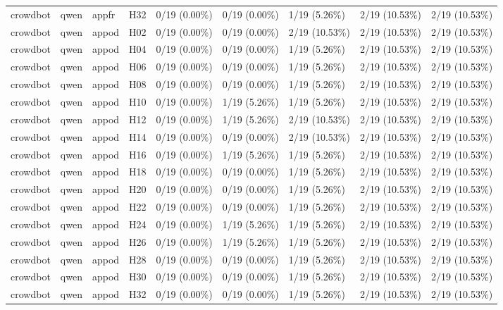 \begin{longtable}{lllllllll}
crowdbot & qwen & appfr & H32 & 0/19 (0.00\%) & 0/19 (0.00\%) & 1/19 (5.26\%) & 2/19 (10.53\%) & 2/19 (10.53\%) \\
crowdbot & qwen & appod & H02 & 0/19 (0.00\%) & 0/19 (0.00\%) & 2/19 (10.53\%) & 2/19 (10.53\%) & 2/19 (10.53\%) \\
crowdbot & qwen & appod & H04 & 0/19 (0.00\%) & 0/19 (0.00\%) & 1/19 (5.26\%) & 2/19 (10.53\%) & 2/19 (10.53\%) \\
crowdbot & qwen & appod & H06 & 0/19 (0.00\%) & 0/19 (0.00\%) & 1/19 (5.26\%) & 2/19 (10.53\%) & 2/19 (10.53\%) \\
crowdbot & qwen & appod & H08 & 0/19 (0.00\%) & 0/19 (0.00\%) & 1/19 (5.26\%) & 2/19 (10.53\%) & 2/19 (10.53\%) \\
crowdbot & qwen & appod & H10 & 0/19 (0.00\%) & 1/19 (5.26\%) & 1/19 (5.26\%) & 2/19 (10.53\%) & 2/19 (10.53\%) \\
crowdbot & qwen & appod & H12 & 0/19 (0.00\%) & 1/19 (5.26\%) & 2/19 (10.53\%) & 2/19 (10.53\%) & 2/19 (10.53\%) \\
crowdbot & qwen & appod & H14 & 0/19 (0.00\%) & 0/19 (0.00\%) & 2/19 (10.53\%) & 2/19 (10.53\%) & 2/19 (10.53\%) \\
crowdbot & qwen & appod & H16 & 0/19 (0.00\%) & 1/19 (5.26\%) & 1/19 (5.26\%) & 2/19 (10.53\%) & 2/19 (10.53\%) \\
crowdbot & qwen & appod & H18 & 0/19 (0.00\%) & 0/19 (0.00\%) & 1/19 (5.26\%) & 2/19 (10.53\%) & 2/19 (10.53\%) \\
crowdbot & qwen & appod & H20 & 0/19 (0.00\%) & 0/19 (0.00\%) & 1/19 (5.26\%) & 2/19 (10.53\%) & 2/19 (10.53\%) \\
crowdbot & qwen & appod & H22 & 0/19 (0.00\%) & 0/19 (0.00\%) & 1/19 (5.26\%) & 2/19 (10.53\%) & 2/19 (10.53\%) \\
crowdbot & qwen & appod & H24 & 0/19 (0.00\%) & 1/19 (5.26\%) & 1/19 (5.26\%) & 2/19 (10.53\%) & 2/19 (10.53\%) \\
crowdbot & qwen & appod & H26 & 0/19 (0.00\%) & 1/19 (5.26\%) & 1/19 (5.26\%) & 2/19 (10.53\%) & 2/19 (10.53\%) \\
crowdbot & qwen & appod & H28 & 0/19 (0.00\%) & 0/19 (0.00\%) & 1/19 (5.26\%) & 2/19 (10.53\%) & 2/19 (10.53\%) \\
crowdbot & qwen & appod & H30 & 0/19 (0.00\%) & 0/19 (0.00\%) & 1/19 (5.26\%) & 2/19 (10.53\%) & 2/19 (10.53\%) \\
crowdbot & qwen & appod & H32 & 0/19 (0.00\%) & 0/19 (0.00\%) & 1/19 (5.26\%) & 2/19 (10.53\%) & 2/19 (10.53\%) \\

\end{longtable}
